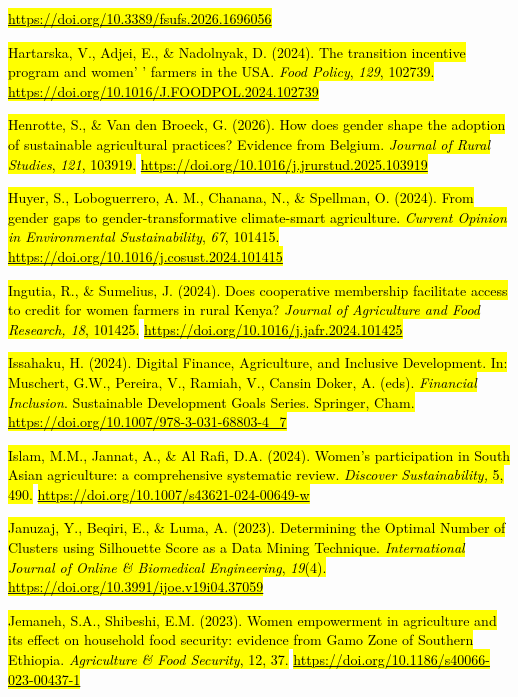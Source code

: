 \href{https://doi.org/10.3389/fsufs.2026.1696056}{\hl{https://doi.org/10.3389/fsufs.2026.1696056}}

\hl{Hartarska, V., Adjei, E., \& Nadolnyak, D. (2024). The transition
incentive program and women' ' farmers in the USA. \emph{Food Policy},
\emph{129}, 102739.}
\href{https://doi.org/10.1016/J.FOODPOL.2024.102739}{\hl{https://doi.org/10.1016/J.FOODPOL.2024.102739}}

\hl{Henrotte, S., \& Van den Broeck, G. (2026). How does gender shape
the adoption of sustainable agricultural practices? Evidence from
Belgium. \emph{Journal of Rural Studies}, \emph{121}, 103919.}
\href{https://doi.org/10.1016/j.jrurstud.2025.103919}{\hl{https://doi.org/10.1016/j.jrurstud.2025.103919}}

\hl{Huyer, S., Loboguerrero, A. M., Chanana, N., \& Spellman, O. (2024).
From gender gaps to gender-transformative climate-smart agriculture.
\emph{Current Opinion in Environmental Sustainability}, \emph{67},
101415.}
\href{https://doi.org/10.1016/j.cosust.2024.101415}{\hl{https://doi.org/10.1016/j.cosust.2024.101415}}

\hl{Ingutia, R., \& Sumelius, J. (2024). Does cooperative membership
facilitate access to credit for women farmers in rural Kenya?
\emph{Journal of Agriculture and Food Research, 18}, 101425.}
\href{https://doi.org/10.1016/j.jafr.2024.101425}{\hl{https://doi.org/10.1016/j.jafr.2024.101425}}

\hl{Issahaku, H. (2024). Digital Finance, Agriculture, and Inclusive
Development. In: Muschert, G.W., Pereira, V., Ramiah, V., Cansin Doker,
A. (eds). \emph{Financial Inclusion}. Sustainable Development Goals
Series. Springer, Cham.}
\href{https://doi.org/10.1007/978-3-031-68803-4_7}{\hl{https://doi.org/10.1007/978-3-031-68803-4\_7}}

\hl{Islam, M.M., Jannat, A., \& Al Rafi, D.A. (2024). Women's
participation in South Asian agriculture: a comprehensive systematic
review. \emph{Discover Sustainability,} 5, 490.}
\href{https://doi.org/10.1007/s43621-024-00649-w}{\hl{https://doi.org/10.1007/s43621-024-00649-w}}

\hl{Januzaj, Y., Beqiri, E., \& Luma, A. (2023). Determining the Optimal
Number of Clusters using Silhouette Score as a Data Mining Technique.
\emph{International Journal of Online \& Biomedical Engineering},
\emph{19}(4).}
\href{https://doi.org/10.3991/ijoe.v19i04.37059}{\hl{https://doi.org/10.3991/ijoe.v19i04.37059}}

\hl{Jemaneh, S.A., Shibeshi, E.M. (2023). Women empowerment in
agriculture and its effect on household food security: evidence from
Gamo Zone of Southern Ethiopia. \emph{Agriculture \& Food Security}, 12,
37.}
\href{https://doi.org/10.1186/s40066-023-00437-1}{\hl{https://doi.org/10.1186/s40066-023-00437-1}}

